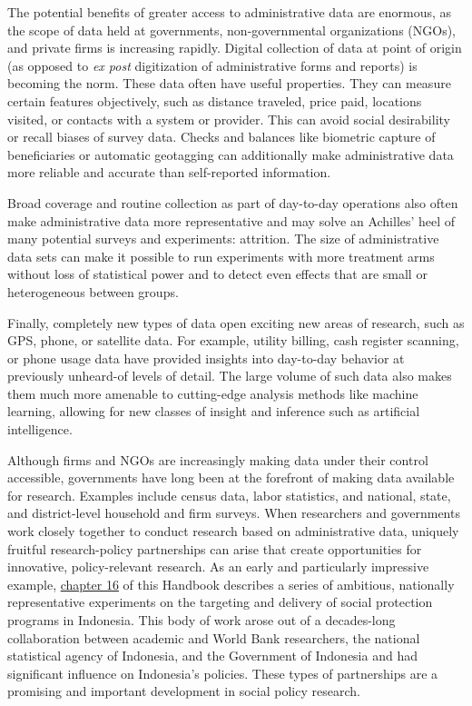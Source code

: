 The potential benefits of greater access to administrative data are enormous, as the scope of data held at governments, non-governmental organizations (NGOs), and private firms is increasing rapidly. Digital collection of data at point of origin (as opposed to \emph{ex post} digitization of administrative forms and reports) is becoming the norm. These data often have useful properties. They can measure certain features objectively, such as distance traveled, price paid, locations visited, or contacts with a system or provider. This can avoid social desirability or recall biases of survey data. Checks and balances like biometric capture of beneficiaries or automatic geotagging can additionally make administrative data more reliable and accurate than self-reported information.

Broad coverage and routine collection as part of day-to-day operations also often make administrative data more representative and may solve an Achilles' heel of many potential surveys and experiments: attrition. The size of administrative data sets can make it possible to run experiments with more treatment arms without loss of statistical power and to detect even effects that are small or heterogeneous between groups.

Finally, completely new types of data open exciting new areas of research, such as GPS, phone, or satellite data. For example, utility billing, cash register scanning, or phone usage data have provided insights into day-to-day behavior at previously unheard-of levels of detail. The large volume of such data also makes them much more amenable to cutting-edge analysis methods like machine learning, allowing for new classes of insight and inference such as artificial intelligence.

Although firms and NGOs are increasingly making data under their control accessible, governments have long been at the forefront of making data available for research. Examples include census data, labor statistics, and national, state, and district-level household and firm surveys. When researchers and governments work closely together to conduct research based on administrative data, uniquely fruitful research-policy partnerships can arise that create opportunities for innovative, policy-relevant research. As an early and particularly impressive example, \protect\hyperlink{indonesia}{chapter 16} of this Handbook describes a series of ambitious, nationally representative experiments on the targeting and delivery of social protection programs in Indonesia. This body of work arose out of a decades-long collaboration between academic and World Bank researchers, the national statistical agency of Indonesia, and the Government of Indonesia and had significant influence on Indonesia's policies. These types of partnerships are a promising and important development in social policy research.

